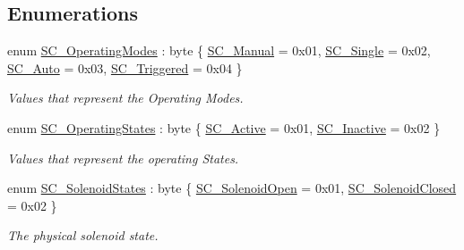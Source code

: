 \subsection*{Enumerations}
\begin{DoxyCompactItemize}
\item 
enum \hyperlink{group___t_cube_solenoid_ga02b53b0f5b45f74b6b2da24cc6ff2895}{S\+C\+\_\+\+Operating\+Modes} \+: byte \{ \hyperlink{group___t_cube_solenoid_gga02b53b0f5b45f74b6b2da24cc6ff2895a3870e0e3904a481e0316dd002818c29d}{S\+C\+\_\+\+Manual} = 0x01, 
\hyperlink{group___t_cube_solenoid_gga02b53b0f5b45f74b6b2da24cc6ff2895a3e19508281fb56ac01c8bcede755ee2a}{S\+C\+\_\+\+Single} = 0x02, 
\hyperlink{group___t_cube_solenoid_gga02b53b0f5b45f74b6b2da24cc6ff2895a8bfba8e62ad241adcd6f3b6cbd5e15b2}{S\+C\+\_\+\+Auto} = 0x03, 
\hyperlink{group___t_cube_solenoid_gga02b53b0f5b45f74b6b2da24cc6ff2895a8991cc94b0eb629be783966c6eaeb222}{S\+C\+\_\+\+Triggered} = 0x04
 \}\begin{DoxyCompactList}\small\item\em Values that represent the Operating Modes. \end{DoxyCompactList}
\item 
enum \hyperlink{group___t_cube_solenoid_ga461bf79287155a8e550ed5190d4cba21}{S\+C\+\_\+\+Operating\+States} \+: byte \{ \hyperlink{group___t_cube_solenoid_gga461bf79287155a8e550ed5190d4cba21acf7af4414d47e719c686d18777e18803}{S\+C\+\_\+\+Active} = 0x01, 
\hyperlink{group___t_cube_solenoid_gga461bf79287155a8e550ed5190d4cba21a112502feb0758ff14ff75aad18a94560}{S\+C\+\_\+\+Inactive} = 0x02
 \}\begin{DoxyCompactList}\small\item\em Values that represent the operating States. \end{DoxyCompactList}
\item 
enum \hyperlink{group___t_cube_solenoid_ga7d02c132bccc65b9364fcba1dba4277e}{S\+C\+\_\+\+Solenoid\+States} \+: byte \{ \hyperlink{group___t_cube_solenoid_gga7d02c132bccc65b9364fcba1dba4277eab5aade0db372849f695650e1017cb4b2}{S\+C\+\_\+\+Solenoid\+Open} = 0x01, 
\hyperlink{group___t_cube_solenoid_gga7d02c132bccc65b9364fcba1dba4277ea960ff0fbeb0865173691c9726fc79899}{S\+C\+\_\+\+Solenoid\+Closed} = 0x02
 \}\begin{DoxyCompactList}\small\item\em The physical solenoid state. \end{DoxyCompactList}
\end{DoxyCompactItemize}

